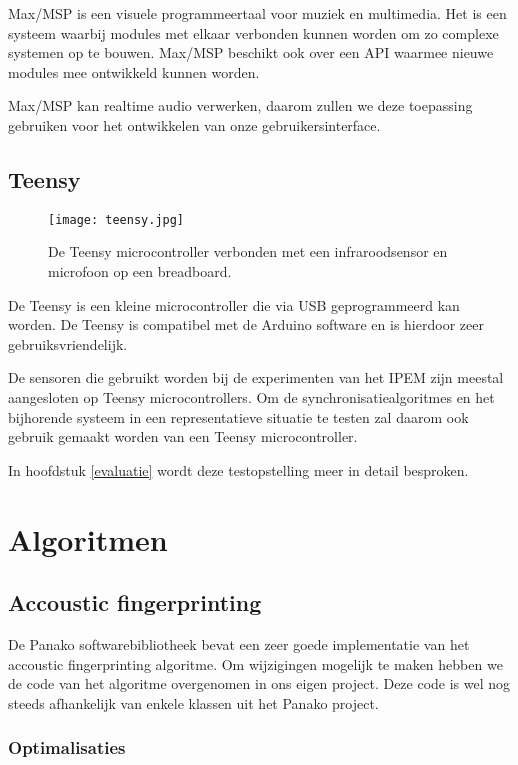 Max/MSP is een visuele programmeertaal voor muziek en multimedia. Het is een systeem waarbij modules met elkaar verbonden kunnen worden om zo complexe systemen op te bouwen. Max/MSP beschikt ook over een API waarmee nieuwe modules mee ontwikkeld kunnen worden. \cite{cycling2016}

Max/MSP kan realtime audio verwerken, daarom zullen we deze toepassing gebruiken voor het ontwikkelen van onze gebruikersinterface. 

\subsection{Teensy}

\begin{figure}[!h]
	\captionsetup{width=0.7\textwidth}
	\caption[Teensy microcontroller]{De Teensy microcontroller verbonden met een infraroodsensor en microfoon op een breadboard.}
	\centering
	\advance\parskip0.3cm
	\texttt{[image: teensy.jpg]}
\end{figure}

De Teensy is een kleine microcontroller die via USB geprogrammeerd kan worden. De Teensy is compatibel met de Arduino software en is hierdoor zeer gebruiksvriendelijk. \cite{teensy2016}

De sensoren die gebruikt worden bij de experimenten van het IPEM zijn meestal aangesloten op Teensy microcontrollers.
Om de synchronisatiealgoritmes en het bijhorende systeem in een representatieve situatie te testen zal daarom ook gebruik gemaakt worden van een Teensy microcontroller.

In hoofdstuk \ref{evaluatie} wordt deze testopstelling meer in detail besproken.


\section{Algoritmen}

\subsection{Accoustic fingerprinting}

De Panako softwarebibliotheek bevat een zeer goede implementatie van het accoustic fingerprinting algoritme. Om wijzigingen mogelijk te maken hebben we de code van het algoritme overgenomen in ons eigen project. Deze code is wel nog steeds afhankelijk van enkele klassen uit het Panako project. 

\subsubsection{Optimalisaties}

